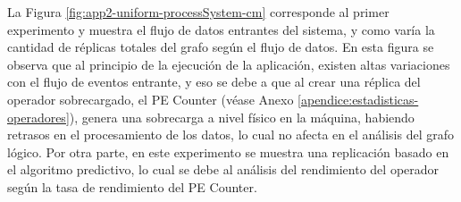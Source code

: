 %
%
%
%
%


La Figura \ref{fig:app2-uniform-processSystem-cm} \normalsize{corresponde al primer experimento y muestra el flujo de datos entrantes del sistema, y como varía la cantidad de réplicas totales del grafo según el flujo de datos.} En esta figura \normalsize{se observa que al principio de la ejecución de la aplicación, existen altas variaciones con el flujo de eventos entrante, y eso se debe a que al crear una réplica del operador sobrecargado, el PE Counter} (véase Anexo \ref{apendice:estadisticas-operadores}), \normalsize{genera una sobrecarga a nivel físico en la máquina, habiendo retrasos en el procesamiento de los datos, lo cual no afecta en el análisis del grafo lógico. Por otra parte, en este experimento se muestra una replicación basado en el algoritmo predictivo, lo cual se debe al análisis del rendimiento del operador según la tasa de rendimiento del PE Counter.}

